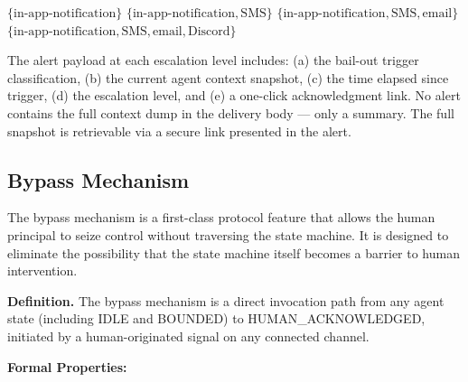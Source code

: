 \bigskip

\begin{algorithm}
\caption{Channel Assignment per Escalation Level}
\begin{algorithmic}[1]
        \State \Return $\{\text{in-app-notification}\}$
        \State \Return $\{\text{in-app-notification}, \text{SMS}\}$
        \State \Return $\{\text{in-app-notification}, \text{SMS}, \text{email}\}$
        \State \Return $\{\text{in-app-notification}, \text{SMS}, \text{email}, \text{Discord}\}$
    \EndIf
\EndFunction
\end{algorithmic}
\end{algorithm}

\bigskip

The alert payload at each escalation level includes: (a) the bail-out trigger classification, (b) the current agent context snapshot, (c) the time elapsed since trigger, (d) the escalation level, and (e) a one-click acknowledgment link. No alert contains the full context dump in the delivery body — only a summary. The full snapshot is retrievable via a secure link presented in the alert.

\bigskip

\subsection{Bypass Mechanism}

The bypass mechanism is a first-class protocol feature that allows the human principal to seize control without traversing the state machine. It is designed to eliminate the possibility that the state machine itself becomes a barrier to human intervention.

\bigskip

\bigskip

\noindent\textbf{Definition.} The bypass mechanism is a direct invocation path from any agent state (including IDLE and BOUNDED) to HUMAN\_ACKNOWLEDGED, initiated by a human-originated signal on any connected channel.

\bigskip

\noindent\textbf{Formal Properties:}

